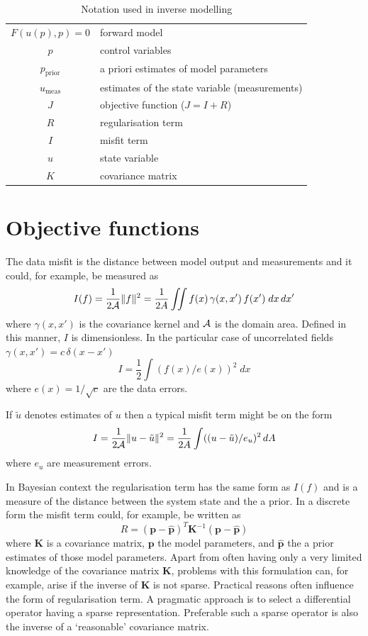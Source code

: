 \documentclass[10pt,a4paper]{book}
\begin{document}
\begin{table}[tb]
\caption{\label{tab:inv} Notation used in inverse modelling}
\begin{center}
\begin{tabular}{cl}
\hline
$F(u(p),p)=0$ & forward model \\
$p$ & control variables \\
$p_{\mathrm{prior}}$  & a priori estimates of model parameters\\
$u_{\mathrm{meas}}$ & estimates of the state variable (measurements) \\  
$J$ & objective function ($J=I+R$)\\
$R$ & regularisation term\\
$I$ & misfit term\\
$u$ & state variable\\
$K$ & covariance matrix \\
\hline
\end{tabular}
\end{center}
\end{table}


\section{Objective functions}


The data misfit is the distance between model output and measurements and
it could, for example, be measured as
\begin{equation}
I(f) = \frac{1}{2 \cal{A}} \| f \|^2 = \frac{1}{2A} \iint  f(x) \, \gamma(x,x') \, f(x')\; dx \, dx'
\label{eq:O1}
\end{equation}
where $\gamma(x,x')$ is the covariance kernel and $\cal{A}$ is the
domain area. Defined in this manner, $I$ is dimensionless. In the
particular case of uncorrelated fields
$\gamma(x,x')= c \,\delta(x-x')$
\begin{equation}
I =\frac{1}{2} \int  (f(x)/e(x))^2\; dx 
\label{eq:O2}
\end{equation}
where $e(x)=1/\sqrt{c}$ are the data errors. 

If $\tilde{u}$ denotes estimates of $u$ then a typical misfit term might be on the form
\[
I= \frac{1}{2 \cal{A}} \| u-\tilde{u} \|^2 = \frac{1}{2A} \int  ((u-\tilde{u})/e_u)^2 \, dA
\]
where $e_u$ are measurement errors.

In Bayesian context the regularisation term has the same form as
$I(f)$ and is a measure of the distance between the system state and
the a prior. In a discrete form the misfit term could, for example, be
written as
\[
R=(\bm{p}-\hat{\bm{p}})^T \bm{K}^{-1}  (\bm{p}-\hat{\bm{p}}) 
\]
where $\bm{K}$ is a covariance matrix, $\bm{p}$ the model parameters,
and $\hat{\bm{p}}$ the a prior estimates of those model
parameters. Apart from often having only a very limited knowledge of
the covariance matrix $\bm{K}$, problems with this formulation can,
for example, arise if the inverse of $\bm{K}$ is not sparse. Practical
reasons often influence the form of regularisation term. A pragmatic
approach is to select a differential operator having a sparse
representation. Preferable such a sparse operator is also the inverse
of a `reasonable' covariance matrix.
\end{document}

